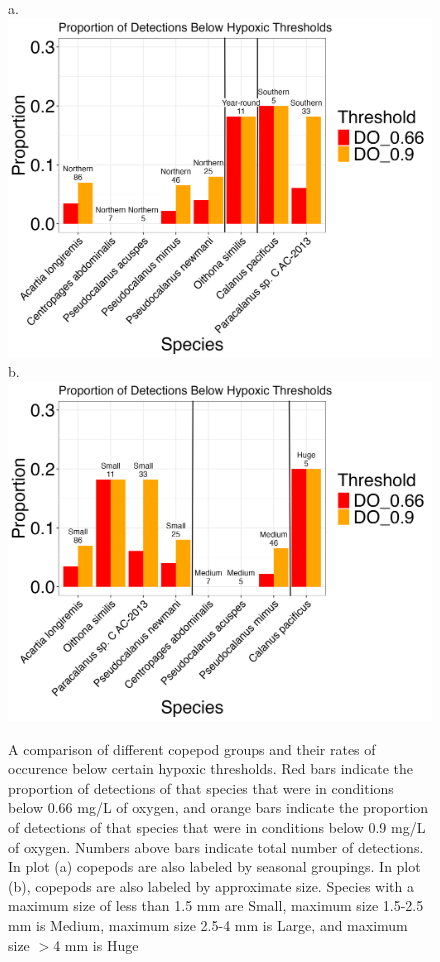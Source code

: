 \documentclass[12pt,twoside]{reedthesis}
\begin{document}
{	\begin{figure}[!h]
		\begin{center}
			a. \includegraphics[scale=0.5]{Bar_Season} \\
			b. \includegraphics[scale=0.5]{Bar_Size}
			\caption[Proportion of Detections Below Hypoxic Thresholds]{\footnotesize{A comparison of different copepod groups and their rates of occurence below certain hypoxic thresholds. Red bars indicate the proportion of detections of that species that were in conditions below 0.66 mg/L of oxygen, and orange bars indicate the proportion of detections of that species that were in conditions below 0.9 mg/L of oxygen. Numbers above bars indicate total number of detections. In plot (a) copepods are also labeled by seasonal groupings. In plot (b), copepods are also labeled by approximate size. Species with a maximum size of less than 1.5 mm are Small, maximum size 1.5-2.5 mm is Medium, maximum size 2.5-4 mm is Large, and maximum size ${>}$4 mm is Huge \autocite{WoRMSWorldRegister}}} %
			\label{BarSeason}
		\end{center}
	\end{figure}    
	
}
\end{document}
